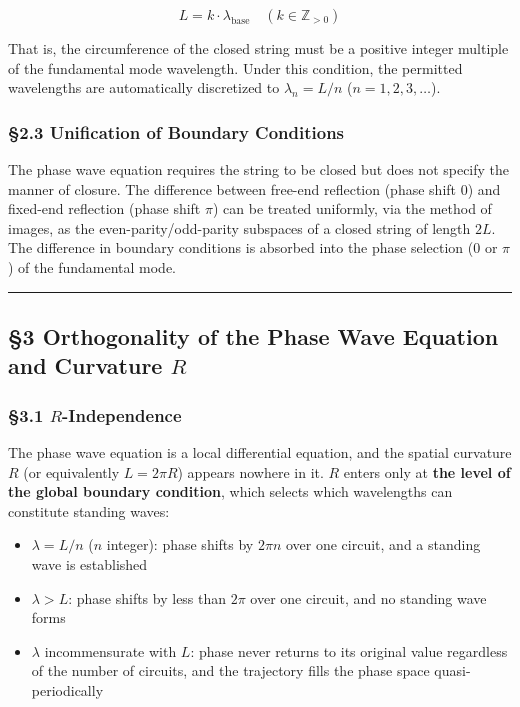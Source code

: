 \documentclass[
  a4paper,11pt]{article}
\providecommand{\tightlist}{%
  \setlength{\itemsep}{0pt}\setlength{\parskip}{0pt}}
\theoremstyle{definition}
\theoremstyle{remark}
\begin{document}
\[L = k \cdot \lambda_{\text{base}} \quad (k \in \mathbb{Z}_{>0})\]

That is, the circumference of the closed string must be a positive
integer multiple of the fundamental mode wavelength. Under this
condition, the permitted wavelengths are automatically discretized to
\(\lambda_n = L/n\) (\(n = 1, 2, 3, \ldots\)).

\subsubsection{§2.3 Unification of Boundary
Conditions}\label{unification-of-boundary-conditions}

The phase wave equation requires the string to be closed but does not
specify the manner of closure. The difference between free-end
reflection (phase shift \(0\)) and fixed-end reflection (phase shift
\(\pi\)) can be treated uniformly, via the method of images, as the
even-parity/odd-parity subspaces of a closed string of length \(2L\).
The difference in boundary conditions is absorbed into the phase
selection (\(0\) or \(\pi\)) of the fundamental mode.

\begin{center}\rule{0.5\linewidth}{0.5pt}\end{center}

\subsection{\texorpdfstring{§3 Orthogonality of the Phase Wave Equation
and Curvature
\(R\)}{§3 Orthogonality of the Phase Wave Equation and Curvature R}}\label{orthogonality-of-the-phase-wave-equation-and-curvature-r}

\subsubsection{\texorpdfstring{§3.1
\(R\)-Independence}{§3.1 R-Independence}}\label{r-independence}

The phase wave equation is a local differential equation, and the
spatial curvature \(R\) (or equivalently \(L = 2\pi R\)) appears nowhere
in it. \(R\) enters only at \textbf{the level of the global boundary
condition}, which selects which wavelengths can constitute standing
waves:

\begin{itemize}
\tightlist
\item
  \(\lambda = L/n\) (\(n\) integer): phase shifts by \(2\pi n\) over one
  circuit, and a standing wave is established
\item
  \(\lambda > L\): phase shifts by less than \(2\pi\) over one circuit,
  and no standing wave forms
\item
  \(\lambda\) incommensurate with \(L\): phase never returns to its
  original value regardless of the number of circuits, and the
  trajectory fills the phase space quasi-periodically
\end{itemize}
\end{document}
